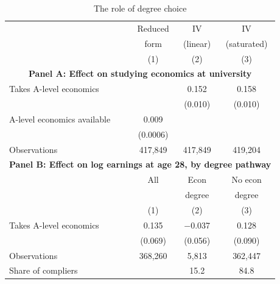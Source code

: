 \begin{table}[htbp]
\centering
\caption{The role of degree choice}
\label{tab:degree_channel}
\begin{tabular}{l ccc}
\toprule
                                      & Reduced      & IV           & IV             \\
                                      & form         & (linear)     & (saturated)    \\
                                      & (1)          & (2)          & (3)            \\
\midrule
\multicolumn{4}{c}{\textbf{Panel A: Effect on studying economics at university}} \\
\midrule
Takes A-level economics               &              & 0.152\sym{***}  & 0.158\sym{***}    \\
                                      &              & (0.010)         & (0.010)           \\
\addlinespace
A-level economics available            & 0.009\sym{***} &              &                \\
                                      & (0.0006)         &              &                \\
\addlinespace
Observations                          & 417,849           & 417,849           & 419,204             \\
\midrule
\multicolumn{4}{c}{\textbf{Panel B: Effect on log earnings at age 28, by degree pathway}} \\
\midrule
                                      & All          & Econ         & No econ        \\
                                      &              & degree       & degree         \\
                                      & (1)          & (2)          & (3)            \\
\midrule
Takes A-level economics               & 0.135\sym{*}  & $-$0.037  & 0.128             \\
                                      & (0.069)         & (0.056)         & (0.090)           \\
\addlinespace
Observations                          & 368,260           & 5,813           & 362,447             \\
Share of compliers                    &              & 15.2           & 84.8             \\

\end{tabular}
\end{table}

